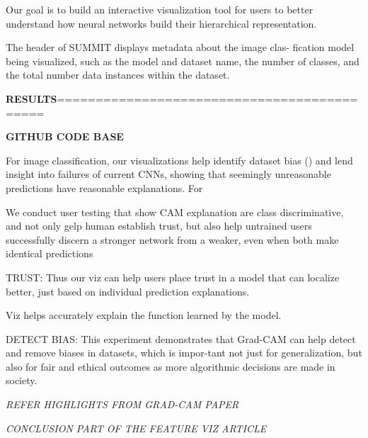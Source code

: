 Our goal is to build an interactive visualization tool for users to better
understand how neural networks build their hierarchical representation.


  The header of SUMMIT displays metadata about the image clas-
fication model being visualized, such as the model and dataset name, the number of classes, and the total number data instances within the dataset.

\textbf{RESULTS}============================================

\textbf{GITHUB CODE BASE}

For image classification, our visualizations help identify dataset bias () and lend insight into failures of current CNNs, showing that seemingly unreasonable predictions have reasonable explanations. For

We conduct user testing that show CAM explanation are class discriminative, and not only gelp  human establish trust, but also help untrained users successfully discern a stronger network from a weaker, even when both make identical predictions

TRUST: Thus our viz can help users place trust in a model that can localize better, just based on individual prediction explanations.

Viz helps accurately explain the function learned by the model.

DETECT BIAS: This experiment demonstrates that Grad-CAM can
help detect and remove biases in datasets, which is impor-tant not just for generalization, but also for fair and ethical
outcomes as more algorithmic decisions are made in society.

\textit{REFER HIGHLIGHTS FROM GRAD-CAM PAPER}

\textit{CONCLUSION PART OF THE FEATURE VIZ ARTICLE}



